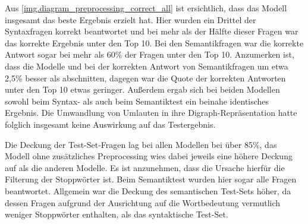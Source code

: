 Aus \autoref{img.diagram_preprocessing_correct_all} ist ersichtlich, dass das Modell  insgesamt das beste Ergebnis erzielt hat. Hier wurden ein Drittel der Syntaxfragen korrekt beantwortet und bei mehr als der Hälfte dieser Fragen war das korrekte Ergebnis unter den Top 10. Bei den Semantikfragen war die korrekte Antwort sogar bei mehr als 60\% der Fragen unter den Top 10. Anzumerken ist, dass die Modelle  und  bei der korrekten Antwort von Semantikfragen um etwa 2,5\% besser als  abschnitten, dagegen war die Quote der korrekten Antworten unter den Top 10 etwas geringer. Außerdem ergab sich bei beiden Modellen sowohl beim Syntax- als auch beim Semantiktest ein beinahe identisches Ergebnis. Die Umwandlung von Umlauten in ihre Digraph-Repräsentation hatte folglich insgesamt keine Auswirkung auf das Testergebnis.


Die Deckung der Test-Set-Fragen lag bei allen Modellen bei über 85\%, das Modell ohne zusätzliches Preprocessing wies dabei jeweils eine höhere Deckung auf als die anderen Modelle. Es ist anzunehmen, dass die Ursache hierfür die Filterung der Stoppwörter ist. Beim Semantiktest wurden hier sogar alle Fragen beantwortet. Allgemein war die Deckung des semantischen Test-Sets höher, da dessen Fragen aufgrund der Ausrichtung auf die Wortbedeutung vermutlich weniger Stoppwörter enthalten, als das syntaktische Test-Set.

